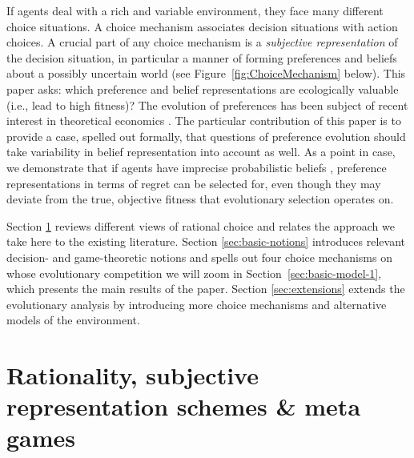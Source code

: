 \documentclass[fleqn,reqno,11pt]{article}
\begin{document}
If agents deal with a rich and variable environment, they face many different choice
situations. A choice mechanism associates decision situations with action choices. A crucial
part of any choice mechanism is a \emph{subjective representation} of the decision situation,
in particular a manner of forming preferences and beliefs about a possibly uncertain world (see
Figure~\ref{fig:ChoiceMechanism} below). This paper asks: which preference and belief
representations are ecologically valuable (i.e., lead to high fitness)? The evolution of
preferences has been subject of recent interest in theoretical economics
\citep[e.g.,][]{algweib13,DekElyYlan07,RobSam11}. The particular contribution of this paper is
to provide a case, spelled out formally, that questions of preference evolution should take
variability in belief representation into account as well. As a point in case, we demonstrate
that if agents have imprecise probabilistic beliefs \citep[e.g.][]{gardsah82,levi74,walley96},
preference representations in terms of regret can be selected for, even though they may deviate
from the true, objective fitness that evolutionary selection operates on.


Section \ref{sec:rati--subj} reviews different views of rational choice and relates the
approach we take here to the existing literature. Section \ref{sec:basic-notions} introduces
relevant decision- and game-theoretic notions and spells out four choice mechanisms on whose
evolutionary competition we will zoom in Section~\ref{sec:basic-model-1}, which presents the
main results of the paper. Section \ref{sec:extensions} extends the evolutionary analysis by
introducing more choice mechanisms and alternative models of the environment.


\section{Rationality, subjective representation schemes \& meta games}
\label{sec:rati--subj}
\end{document}
